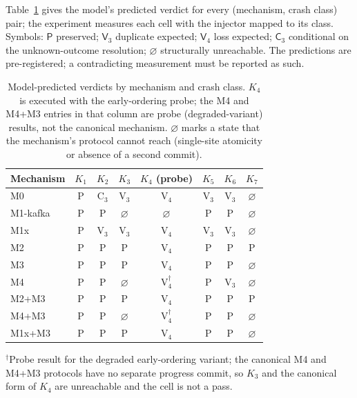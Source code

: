 Table~\ref{tab:crashverdicts} gives the model's predicted verdict for every (mechanism, crash
class) pair; the experiment measures each cell with the injector mapped to its class. Symbols:
$\mathsf{P}$ preserved; $\mathsf{V}_3$ duplicate expected; $\mathsf{V}_4$ loss expected;
$\mathsf{C}_3$ conditional on the unknown-outcome resolution; $\varnothing$ structurally
unreachable. The predictions are pre-registered; a contradicting measurement must be reported as
such.

\begin{table}[t]
\centering
\scriptsize
\caption{Model-predicted verdicts by mechanism and crash class. $K_4$ is executed with the
early-ordering probe; the M4 and M4+M3 entries in that column are probe (degraded-variant)
results, not the canonical mechanism. $\varnothing$ marks a state that the mechanism's protocol
cannot reach (single-site atomicity or absence of a second commit).}
\label{tab:crashverdicts}
\begin{tabular}{@{}lccccccc@{}}
\toprule
Mechanism & $K_1$ & $K_2$ & $K_3$ & $K_4$ (probe) & $K_5$ & $K_6$ & $K_7$ \\
\midrule
M0        & P & C$_3$ & V$_3$ & V$_4$ & V$_3$ & V$_3$ & $\varnothing$ \\
M1-kafka  & P & P     & $\varnothing$ & $\varnothing$ & P & P & $\varnothing$ \\
M1x       & P & V$_3$ & V$_3$ & V$_4$ & V$_3$ & V$_3$ & $\varnothing$ \\
M2        & P & P     & P     & V$_4$ & P     & P     & P \\
M3        & P & P     & P     & V$_4$ & P     & P     & $\varnothing$ \\
M4        & P & P     & $\varnothing$ & V$_4^{\dagger}$ & P & V$_3$ & $\varnothing$ \\
M2+M3     & P & P     & P     & V$_4$ & P     & P     & P \\
M4+M3     & P & P     & $\varnothing$ & V$_4^{\dagger}$ & P & P & $\varnothing$ \\
M1x+M3    & P & P     & P     & V$_4$ & P     & P     & $\varnothing$ \\
\bottomrule
\end{tabular}
\par\smallskip
{\footnotesize $^{\dagger}$Probe result for the degraded early-ordering variant; the canonical
M4 and M4+M3 protocols have no separate progress commit, so $K_3$ and the canonical form of
$K_4$ are unreachable and the cell is not a pass.}
\end{table}

